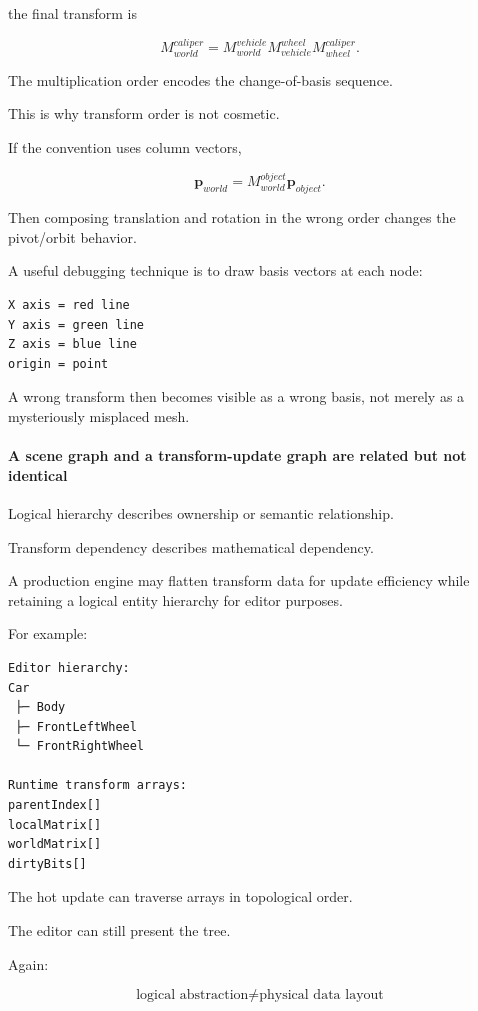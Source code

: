 the final transform is

\[
M_{world}^{caliper}
=
M_{world}^{vehicle}
M_{vehicle}^{wheel}
M_{wheel}^{caliper}.
\]

The multiplication order encodes the change-of-basis sequence.

This is why transform order is not cosmetic.

If the convention uses column vectors,

\[
\mathbf p_{world}
=
M_{world}^{object}
\mathbf p_{object}.
\]

Then composing translation and rotation in the wrong order changes the pivot/orbit behavior.

A useful debugging technique is to draw basis vectors at each node:

\begin{verbatim}
X axis = red line
Y axis = green line
Z axis = blue line
origin = point
\end{verbatim}

A wrong transform then becomes visible as a wrong basis, not merely as a mysteriously misplaced mesh.

\paragraph{A scene graph and a transform-update graph are related but not identical}\label{a-scene-graph-and-a-transform-update-graph-are-related-but-not-identical}

Logical hierarchy describes ownership or semantic relationship.

Transform dependency describes mathematical dependency.

A production engine may flatten transform data for update efficiency while retaining a logical entity hierarchy for editor purposes.

For example:

\begin{verbatim}
Editor hierarchy:
Car
 ├─ Body
 ├─ FrontLeftWheel
 └─ FrontRightWheel

Runtime transform arrays:
parentIndex[]
localMatrix[]
worldMatrix[]
dirtyBits[]
\end{verbatim}

The hot update can traverse arrays in topological order.

The editor can still present the tree.

Again:

\[
\boxed{
\text{logical abstraction}
\neq
\text{physical data layout}
}
\]


